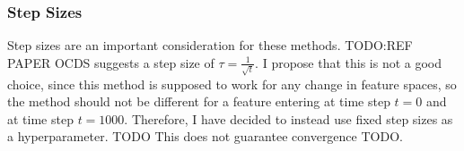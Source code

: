 %
%
%
%

\subsubsection{Step Sizes}

Step sizes are an important consideration for these methods. TODO:REF PAPER
OCDS suggests a step size of $\tau=\frac{1}{\sqrt{t}}$. I propose that this is
not a good choice, since this method is supposed to work for any change in
feature spaces, so the method should not be different for a feature
entering at time step $t=0$ and at time step $t=1000$. Therefore, I have
decided to instead use fixed step sizes as a hyperparameter. TODO This does not guarantee convergence TODO.

